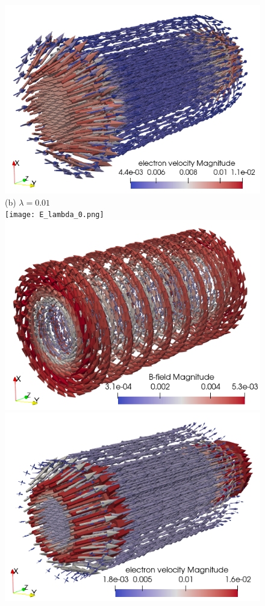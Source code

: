 \documentclass{report}
\begin{document}
\begin{figure}
    \includegraphics[scale=0.35]{ue_lambda_1e-2.png} \\
    (b) $\lambda = 0.01$ \\
    \texttt{[image: E\_lambda\_0.png]}
    \includegraphics[scale=0.35]{B_lambda_0.png}
    \includegraphics[scale=0.35]{ue_lambda_0.png} \\

\end{figure}
\end{document}
